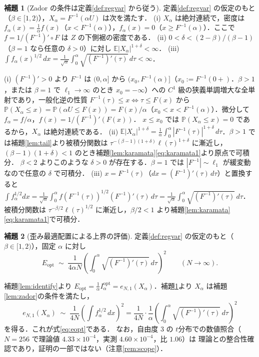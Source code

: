 \documentclass[a4paper,10pt]{jsarticle}
\makeatletter
\theoremstyle{definition}
\newtheorem{lemma}{補題}[section]
\renewenvironment{proof}[1][\proofname]{\par
  \pushQED{\qed}%
  \normalfont \topsep6\p@\@plus6\p@\relax
  \trivlist
  \item[\hskip\labelsep\textbf{#1}]\ignorespaces
}{%
  \popQED\endtrivlist\@endpefalse
}
\renewcommand{\proofname}{証明}
\newcommand{\Finv}{F^{-1}}
\newcommand{\E}{\mathbb{E}}
\newcommand{\Prob}{\mathbb{P}}
\newcommand{\eN}{e_{N,1}}
\newcommand{\Eopt}{E_{\mathrm{opt}}}
\newcommand{\Iopt}{I_\alpha^{\mathrm{opt}}}
\makeatother
\begin{document}
\begin{lemma}[Zador の条件は定義\ref{def:regvar} から従う]
\label{lem:zador-cond}
定義\ref{def:regvar} の仮定のもと（$\beta\in[1,2)$），$X_\alpha=\Finv(\alpha U)$ は次を満たす．
(i) $X_\alpha$ は絶対連続で，密度は $f_\alpha(x)=\frac1\alpha f(x)$（$x<\Finv(\alpha)$），$f_\alpha(x)=0$（$x\ge\Finv(\alpha)$）．ここで $f=1/(\Finv)'\circ F$ は $Z$ の下側裾の密度である．
(ii) $0<\delta<(2-\beta)/(\beta-1)$（$\beta=1$ なら任意の $\delta>0$）に対し $\E|X_\alpha|^{1+\delta}<\infty$．
(iii) $\displaystyle\int f_\alpha(x)^{1/2}\,dx=\frac1{\sqrt\alpha}\int_0^\alpha\sqrt{(\Finv)'(\tau)}\,d\tau<\infty$．
\end{lemma}
\begin{proof}
(i) $(\Finv)'>0$ より $\Finv$ は $(0,\alpha]$ から $(x_0,\Finv(\alpha)]$（$x_0:=\Finv(0+)$．$\beta>1$，または $\beta=1$ で $\ell_1\to\infty$ のとき $x_0=-\infty$）への
$C^1$ 級の狭義単調増大な全単射であり，一般化逆の性質 $\Finv(\tau)\le x\iff\tau\le F(x)$ から
$\Prob(X_\alpha\le x)=\Prob(\alpha U\le F(x))=F(x)/\alpha$（$x_0<x<\Finv(\alpha)$）．微分して $f_\alpha=f/\alpha$，$f(x)=1/(\Finv)'(F(x))$．
$x\le x_0$ では $\Prob(X_\alpha\le x)=0$ であるから，$X_\alpha$ は絶対連続である．
(ii) $\E|X_\alpha|^{1+\delta}=\frac1\alpha\int_0^\alpha|\Finv(\tau)|^{1+\delta}\,d\tau$．$\beta>1$ では補題\ref{lem:tail}より被積分関数は
$\tau^{-(\beta-1)(1+\delta)}\ell(\tau)^{1+\delta}$ に漸近し，$(\beta-1)(1+\delta)<1$ のとき補題\ref{lem:karamata}\eqref{eq:karamata1}より原点で可積分．
$\beta<2$ よりこのような $\delta>0$ が存在する．$\beta=1$ では $|\Finv|\sim\ell_1$ が緩変動なので任意の $\delta$ で可積分．
(iii) $x=\Finv(\tau)$（$dx=(\Finv)'(\tau)\,d\tau$）と置換すると
$\int f_\alpha^{1/2}dx=\frac1{\sqrt\alpha}\int_0^\alpha f(\Finv(\tau))^{1/2}(\Finv)'(\tau)\,d\tau=\frac1{\sqrt\alpha}\int_0^\alpha\sqrt{(\Finv)'(\tau)}\,d\tau$．
被積分関数は $\tau^{-\beta/2}\ell(\tau)^{1/2}$ に漸近し，$\beta/2<1$ より補題\ref{lem:karamata}\eqref{eq:karamata1}で可積分．
\end{proof}

\begin{lemma}[歪み最適配置による上界の評価]
\label{lem:opt}
定義\ref{def:regvar} の仮定のもと（$\beta\in[1,2)$），固定 $\alpha$ に対し
\begin{equation}
  \Eopt\;\sim\;\frac1{4\alpha N}\left(\int_0^\alpha\sqrt{(\Finv)'(\tau)}\,d\tau\right)^{2}
  \qquad(N\to\infty).
  \label{eq:eopt}
\end{equation}
\end{lemma}
\begin{proof}
補題\ref{lem:identify}より $\Eopt=\frac1\alpha\Iopt=\eN(X_\alpha)$．補題\ref{lem:zador-cond}より $X_\alpha$ は補題\ref{lem:zador}の条件を満たし，
\begin{equation*}
\eN(X_\alpha)\;\sim\;\frac1{4N}\left(\int f_\alpha^{1/2}\,dx\right)^{2}
=\frac1{4N}\cdot\frac1\alpha\left(\int_0^\alpha\sqrt{(\Finv)'(\tau)}\,d\tau\right)^{2}
\end{equation*}
を得る．これが式\eqref{eq:eopt}である．
なお，自由度 $3$ の $t$分布での数値照合（$N=256$ で理論値 $4.33\times10^{-4}$，実測 $4.60\times10^{-4}$，比 $1.06$）は
理論との整合性確認であり，証明の一部ではない（注意\ref{rem:scope}）．
\end{proof}
\end{document}

